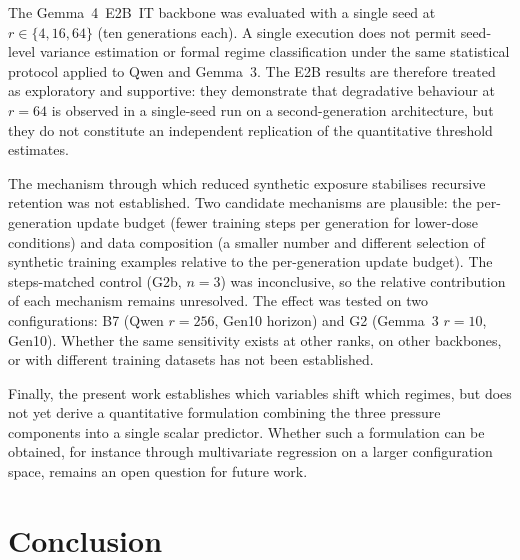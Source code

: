 \documentclass[a4paper,fleqn]{cas-dc}
\newif\ifshowchanges
\newcommand{\rev}[1]{\ifshowchanges{\color{blue}#1}\else{#1}\fi}
\begin{document}
\rev{The Gemma~4~E2B~IT backbone was evaluated with a single seed at $r \in \{4, 16, 64\}$
(ten generations each). A single execution does not permit
seed-level variance estimation or formal regime classification under the
same statistical protocol applied to Qwen and Gemma~3. The E2B results are
therefore treated as exploratory and supportive: they demonstrate that degradative behaviour at $r=64$ is \rev{observed in a single-seed run} on a second-generation
architecture, but they do not constitute an independent replication of the
quantitative threshold estimates.}

\rev{The mechanism through which reduced synthetic exposure stabilises
recursive retention was not established. Two candidate mechanisms are
plausible: the per-generation update budget (fewer training steps per
generation for lower-dose conditions) and data composition (\rev{a smaller number and different selection of synthetic training examples}
relative to the per-generation update budget). The
steps-matched control (G2b, $n=3$) was inconclusive, so the
relative contribution of each mechanism remains unresolved. The effect
was tested on two configurations: B7 (Qwen $r=256$, Gen10
horizon) and G2 (Gemma~3 $r=10$, Gen10). Whether the same sensitivity exists at other
ranks, on other backbones, or with different training datasets
has not been established.}

Finally, the present work establishes which variables shift which regimes,
but does not yet derive a quantitative formulation combining the three pressure
components into a single scalar predictor. Whether such a formulation can be
obtained, for instance through multivariate regression on a larger configuration
space, remains an open question for future work.

\section{Conclusion}\label{sec:conclusion}
\end{document}
